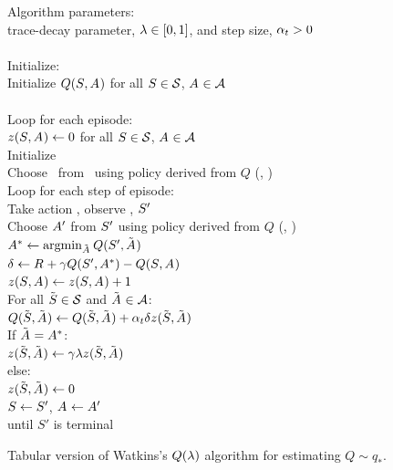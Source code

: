 \begin{table}
\beginalg
Algorithm parameters:\\
\> trace-decay parameter, $\lambda \in [0,1]$, and step size, $\alpha_{t}>0$\\
\\
Initialize:
\\
\> Initialize $Q(S_{}, A_{})$ for all $S_{}\in\mathcal{S}$, $A_{}\in\mathcal{A}$\\
\\
Loop for each episode:\\
\> $z_{}(S_{}, A_{}) \leftarrow 0$ for all ${S_{}}\in\mathcal{S}$, $A_{}\in\mathcal{A}$\\
\> Initialize \state{}\\
\> Choose \action{}\ from \state{}\ using policy derived from $Q$ (\eg, \epsgreedy)\\
\> Loop for each step of episode:\\
\> \> Take action \action, observe \reward{}, $S_{}'$\\
\> \> Choose $A_{}'$ from $S_{}'$ using policy derived from $Q$ (\eg, \epsgreedy)\\
\> \> $A_{}^\ast \leftarrow  \mathop{\mathrm {argmin}}_{\tilde{A_{}}} Q(S_{}', \tilde{A_{}})$\\
\> \> $\delta_{} \leftarrow R_{} + \gamma Q(S_{}', A_{}^\ast) - Q (S_{}, A_{})$\\
\> \> $z_{}(S_{}, A_{}) \leftarrow z_{}(S_{}, A_{}) + 1$\\
\> \> For all $\tilde{S_{}} \in \mathcal{S}$ and $\tilde{A_{}} \in \mathcal{A}$:\\
\> \> \> $Q(\tilde{S_{}}, \tilde{A_{}}) \leftarrow Q(\tilde{S_{}}, \tilde{A_{}}) + \alpha_{t} \delta_{} z_{}(\tilde{S_{}}, \tilde{A_{}})$\\
\> \> \> If $\tilde{A_{}} = A_{}^\ast$:\\
\> \> \> \> $z_{}(\tilde{S_{}}, \tilde{A_{}}) \leftarrow \gamma \lambda z_{}(\tilde{S_{}}, \tilde{A_{}})$\\
\> \> \> else:\\
\> \> \> \> $z_{}(\tilde{S_{}}, \tilde{A_{}}) \leftarrow 0$\\
\> \> $S_{} \leftarrow S_{}'$, $A_{} \leftarrow A_{}'$\\
\> until $S'$ is terminal
\endalg
\caption{Tabular version of Watkins's $Q(\lambda)$ algorithm for estimating $Q\sim q_\ast$.}
\label{tab:alg:et:tabular-q}
\end{table}












